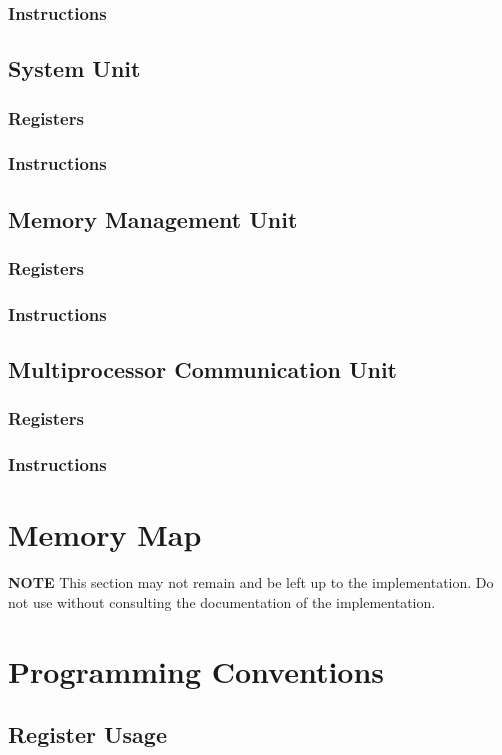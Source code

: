 \documentclass[letterpaper, 11pt]{article}
\begin{document}
\subsubsection{Instructions}
\subsection{System Unit}
\subsubsection{Registers}
\subsubsection{Instructions}
\subsection{Memory Management Unit}
\subsubsection{Registers}
\subsubsection{Instructions}
\subsection{Multiprocessor Communication Unit}
\subsubsection{Registers}
\subsubsection{Instructions}

\section{Memory Map}
\textbf{NOTE}
This section may not remain and be left up to the implementation. Do not use without consulting
the documentation of the implementation.
\section{Programming Conventions}
\subsection{Register Usage}
\end{document}
